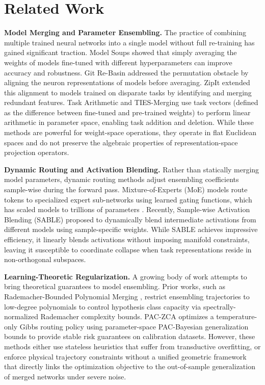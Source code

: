 \section{Related Work}
\label{sec:related}

\textbf{Model Merging and Parameter Ensembling.}
The practice of combining multiple trained neural networks into a single model without full re-training has gained significant traction. Model Soups \cite{wortsman22} showed that simply averaging the weights of models fine-tuned with different hyperparameters can improve accuracy and robustness. Git Re-Basin \cite{ainsworth22} addressed the permutation obstacle by aligning the neuron representations of models before averaging. ZipIt \cite{stoica23} extended this alignment to models trained on disparate tasks by identifying and merging redundant features. Task Arithmetic \cite{ilharco22, wang22} and TIES-Merging \cite{yadav23} use task vectors (defined as the difference between fine-tuned and pre-trained weights) to perform linear arithmetic in parameter space, enabling task addition and deletion. While these methods are powerful for weight-space operations, they operate in flat Euclidean spaces and do not preserve the algebraic properties of representation-space projection operators.

\textbf{Dynamic Routing and Activation Blending.}
Rather than statically merging model parameters, dynamic routing methods adjust ensembling coefficients sample-wise during the forward pass. Mixture-of-Experts (MoE) models \cite{jacobs91, jordan94, shazeer17} route tokens to specialized expert sub-networks using learned gating functions, which has scaled models to trillions of parameters \cite{fedus21, jiang24}. Recently, Sample-wise Activation Blending (SABLE) \cite{dauner23} proposed to dynamically blend intermediate activations from different models using sample-specific weights. While SABLE achieves impressive efficiency, it linearly blends activations without imposing manifold constraints, leaving it susceptible to coordinate collapse when task representations reside in non-orthogonal subspaces.

\textbf{Learning-Theoretic Regularization.}
A growing body of work attempts to bring theoretical guarantees to model ensembling. Prior works, such as Rademacher-Bounded Polynomial Merging \cite{maurer04}, restrict ensembling trajectories to low-degree polynomials to control hypothesis class capacity via spectrally-normalized Rademacher complexity bounds. PAC-ZCA \cite{mcallester99, catoni07, donini20} optimizes a temperature-only Gibbs routing policy using parameter-space PAC-Bayesian generalization bounds to provide stable risk guarantees on calibration datasets. However, these methods either use stateless heuristics that suffer from transductive overfitting, or enforce physical trajectory constraints without a unified geometric framework that directly links the optimization objective to the out-of-sample generalization of merged networks under severe noise.

